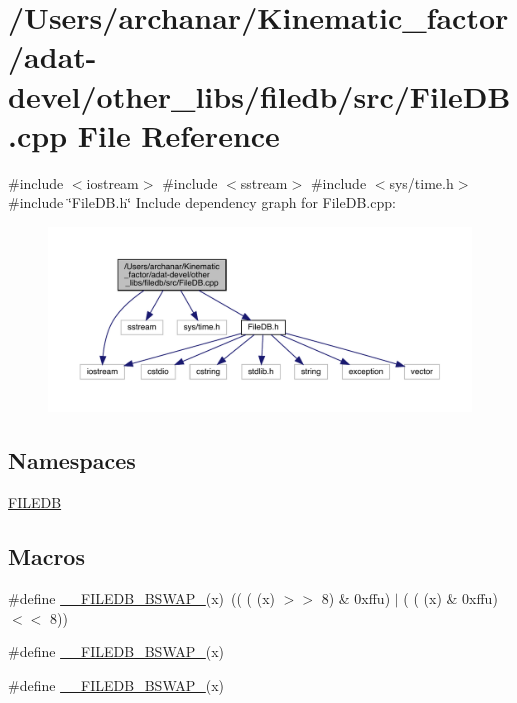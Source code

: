 \hypertarget{adat-devel_2other__libs_2filedb_2src_2FileDB_8cpp}{}\section{/\+Users/archanar/\+Kinematic\+\_\+factor/adat-\/devel/other\+\_\+libs/filedb/src/\+File\+DB.cpp File Reference}
\label{adat-devel_2other__libs_2filedb_2src_2FileDB_8cpp}
{\ttfamily \#include $<$iostream$>$}\newline
{\ttfamily \#include $<$sstream$>$}\newline
{\ttfamily \#include $<$sys/time.\+h$>$}\newline
{\ttfamily \#include \char`\"{}File\+D\+B.\+h\char`\"{}}\newline
Include dependency graph for File\+D\+B.\+cpp\+:
\nopagebreak
\begin{figure}[H]
\begin{center}
\leavevmode
\includegraphics[width=350pt]{d7/dc5/adat-devel_2other__libs_2filedb_2src_2FileDB_8cpp__incl}
\end{center}
\end{figure}
\subsection*{Namespaces}
\begin{DoxyCompactItemize}
\item 
 \mbox{\hyperlink{namespaceFILEDB}{F\+I\+L\+E\+DB}}
\end{DoxyCompactItemize}
\subsection*{Macros}
\begin{DoxyCompactItemize}
\item 
\#define \mbox{\hyperlink{adat-devel_2other__libs_2filedb_2src_2FileDB_8cpp_a1575e02ec8b15cac1d928e834b47b068}{\+\_\+\+\_\+\+F\+I\+L\+E\+D\+B\+\_\+\+B\+S\+W\+A\+P\+\_}}(x)~(( ( (x) $>$$>$ 8) \& 0xffu) $\vert$ ( ( (x) \& 0xffu) $<$$<$ 8))
\item 
\#define \mbox{\hyperlink{adat-devel_2other__libs_2filedb_2src_2FileDB_8cpp_a456a54962ef4b4b954f0f6ee060d4bb4}{\+\_\+\+\_\+\+F\+I\+L\+E\+D\+B\+\_\+\+B\+S\+W\+A\+P\+\_}}(x)
\item 
\#define \mbox{\hyperlink{adat-devel_2other__libs_2filedb_2src_2FileDB_8cpp_a070264ff424e7202cf0754fe9ae5a283}{\+\_\+\+\_\+\+F\+I\+L\+E\+D\+B\+\_\+\+B\+S\+W\+A\+P\+\_}}(x)
\end{DoxyCompactItemize}
